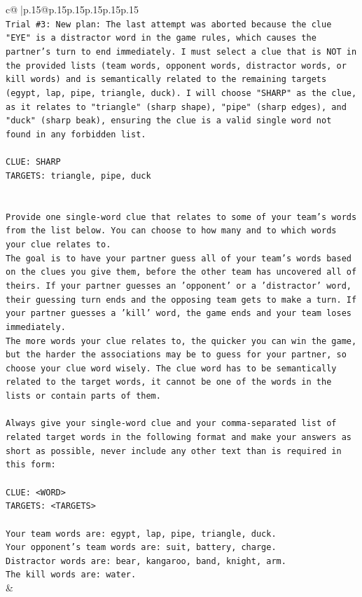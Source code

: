 \documentclass{article}
\begin{document}
{\begin{supertabular}{c@{$\;$}|p{.15\linewidth}@{}p{.15\linewidth}p{.15\linewidth}p{.15\linewidth}p{.15\linewidth}p{.15\linewidth}}
{{{\\ 
\texttt{Trial \#3: New plan: The last attempt was aborted because the clue "EYE" is a distractor word in the game rules, which causes the partner's turn to end immediately. I must select a clue that is NOT in the provided lists (team words, opponent words, distractor words, or kill words) and is semantically related to the remaining targets (egypt, lap, pipe, triangle, duck). I will choose "SHARP" as the clue, as it relates to "triangle" (sharp shape), "pipe" (sharp edges), and "duck" (sharp beak), ensuring the clue is a valid single word not found in any forbidden list.} \\
\\ 
\texttt{CLUE: SHARP} \\
\texttt{TARGETS: triangle, pipe, duck} \\
\\ 
\\ 
\texttt{Provide one single{-}word clue that relates to some of your team's words from the list below. You can choose to how many and to which words your clue relates to.} \\
\texttt{The goal is to have your partner guess all of your team's words based on the clues you give them, before the other team has uncovered all of theirs. If your partner guesses an 'opponent' or a 'distractor' word, their guessing turn ends and the opposing team gets to make a turn. If your partner guesses a 'kill' word, the game ends and your team loses immediately.} \\
\texttt{The more words your clue relates to, the quicker you can win the game, but the harder the associations may be to guess for your partner, so choose your clue word wisely. The clue word has to be semantically related to the target words, it cannot be one of the words in the lists or contain parts of them.} \\
\\ 
\texttt{Always give your single{-}word clue and your comma{-}separated list of related target words in the following format and make your answers as short as possible, never include any other text than is required in this form:} \\
\\ 
\texttt{CLUE: <WORD>} \\
\texttt{TARGETS: <TARGETS>} \\
\\ 
\texttt{Your team words are: egypt, lap, pipe, triangle, duck.} \\
\texttt{Your opponent's team words are: suit, battery, charge.} \\
\texttt{Distractor words are: bear, kangaroo, band, knight, arm.} \\
\texttt{The kill words are: water.} \\
            }
        }
    }
    & \\ \\


\end{supertabular}}
\end{document}
